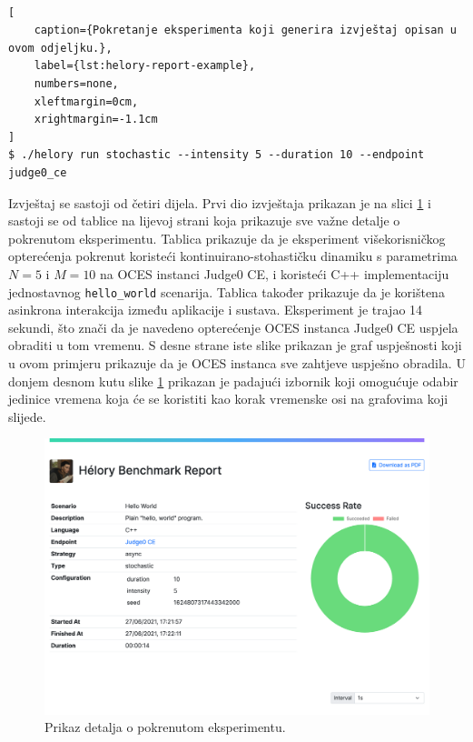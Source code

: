 \documentclass[times, utf8, diplomski]{fer}
\begin{document}
\

\begin{lstlisting}[
    caption={Pokretanje eksperimenta koji generira izvještaj opisan u ovom odjeljku.},
    label={lst:helory-report-example},
    numbers=none,
    xleftmargin=0cm,
    xrightmargin=-1.1cm
]
$ ./helory run stochastic --intensity 5 --duration 10 --endpoint judge0_ce
\end{lstlisting}

Izvještaj se sastoji od četiri dijela. Prvi dio izvještaja prikazan je na slici \ref{fig:report-experiment-details} i sastoji se od tablice na lijevoj strani koja prikazuje sve važne detalje o pokrenutom eksperimentu. Tablica prikazuje da je eksperiment višekorisničkog opterećenja pokrenut koristeći kontinuirano-stohastičku dinamiku s parametrima $N=5$ i $M=10$ na OCES instanci Judge0 CE, i koristeći C++ implementaciju jednostavnog \lstinline{hello_world} scenarija. Tablica također prikazuje da je korištena asinkrona interakcija između aplikacije i sustava. Eksperiment je trajao 14 sekundi, što znači da je navedeno opterećenje OCES instanca Judge0 CE uspjela obraditi u tom vremenu. S desne strane iste slike prikazan je graf uspješnosti koji u ovom primjeru prikazuje da je OCES instanca sve zahtjeve uspješno obradila. U donjem desnom kutu slike \ref{fig:report-experiment-details} prikazan je padajući izbornik  koji omogućuje odabir jedinice vremena koja će se koristiti kao korak vremenske osi na grafovima koji slijede.

\pagebreak

\begin{figure}[htb]
	\centering
	\includegraphics[width=\textwidth]{images/Report UI 1.png}
	\caption{
		Prikaz detalja o pokrenutom eksperimentu.
	}
	\label{fig:report-experiment-details}
\end{figure}
\end{document}
